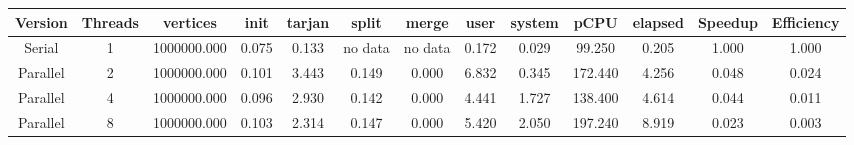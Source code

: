 \begin{tabular}{|c|c|c|c|c|c|c|c|c|c|c|c|c|}
\toprule
 Version &  Threads &    vertices &  init &  tarjan &   split &   merge &  user &  system &    pCPU &  elapsed &  Speedup &  Efficiency \\
\midrule
  Serial &        1 & 1000000.000 & 0.075 &   0.133 & no data & no data & 0.172 &   0.029 &  99.250 &    0.205 &    1.000 &       1.000 \\
Parallel &        2 & 1000000.000 & 0.101 &   3.443 &   0.149 &   0.000 & 6.832 &   0.345 & 172.440 &    4.256 &    0.048 &       0.024 \\
Parallel &        4 & 1000000.000 & 0.096 &   2.930 &   0.142 &   0.000 & 4.441 &   1.727 & 138.400 &    4.614 &    0.044 &       0.011 \\
Parallel &        8 & 1000000.000 & 0.103 &   2.314 &   0.147 &   0.000 & 5.420 &   2.050 & 197.240 &    8.919 &    0.023 &       0.003 \\
\bottomrule
\end{tabular}
